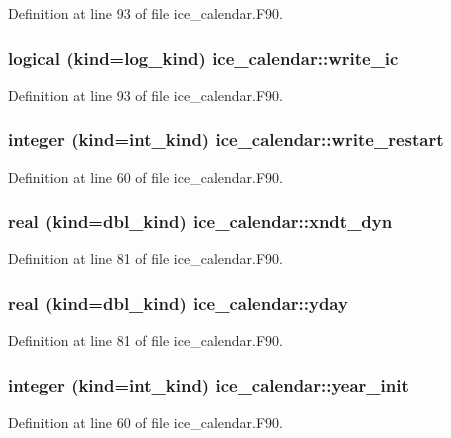 Definition at line 93 of file ice\_\-calendar.F90.\hypertarget{namespaceice__calendar_a0ab845607bc7966960d11bffb6f9f069}{
\subsubsection[{write\_\-ic}]{\setlength{\rightskip}{0pt plus 5cm}logical (kind=log\_\-kind) {\bf ice\_\-calendar::write\_\-ic}}}
\label{namespaceice__calendar_a0ab845607bc7966960d11bffb6f9f069}


Definition at line 93 of file ice\_\-calendar.F90.\hypertarget{namespaceice__calendar_ab014cadf8e461a9743825f528cbd9e7a}{
\subsubsection[{write\_\-restart}]{\setlength{\rightskip}{0pt plus 5cm}integer (kind=int\_\-kind) {\bf ice\_\-calendar::write\_\-restart}}}
\label{namespaceice__calendar_ab014cadf8e461a9743825f528cbd9e7a}


Definition at line 60 of file ice\_\-calendar.F90.\hypertarget{namespaceice__calendar_aaf7ba66b2706feaef77263c10d65e28a}{
\subsubsection[{xndt\_\-dyn}]{\setlength{\rightskip}{0pt plus 5cm}real (kind=dbl\_\-kind) {\bf ice\_\-calendar::xndt\_\-dyn}}}
\label{namespaceice__calendar_aaf7ba66b2706feaef77263c10d65e28a}


Definition at line 81 of file ice\_\-calendar.F90.\hypertarget{namespaceice__calendar_a4b4393c99a1d82bc45fcee5d7f6c1eab}{
\subsubsection[{yday}]{\setlength{\rightskip}{0pt plus 5cm}real (kind=dbl\_\-kind) {\bf ice\_\-calendar::yday}}}
\label{namespaceice__calendar_a4b4393c99a1d82bc45fcee5d7f6c1eab}


Definition at line 81 of file ice\_\-calendar.F90.\hypertarget{namespaceice__calendar_afc3c91ad4e19b987b1e28293ec6ec2b7}{
\subsubsection[{year\_\-init}]{\setlength{\rightskip}{0pt plus 5cm}integer (kind=int\_\-kind) {\bf ice\_\-calendar::year\_\-init}}}
\label{namespaceice__calendar_afc3c91ad4e19b987b1e28293ec6ec2b7}


Definition at line 60 of file ice\_\-calendar.F90.